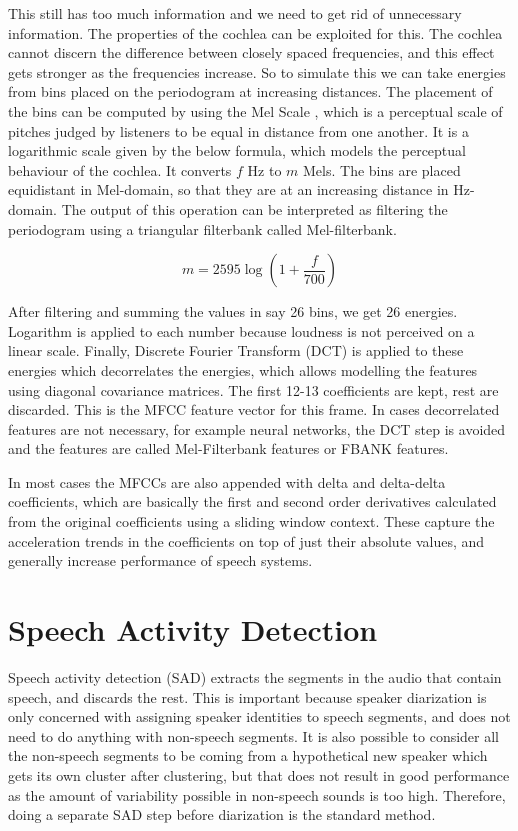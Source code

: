 This still has too much information and we need to get rid of unnecessary information. The properties of the cochlea can be exploited for this. The cochlea cannot discern the difference between closely spaced frequencies, and this effect gets stronger as the frequencies increase. So to simulate this we can take energies from bins placed on the periodogram at increasing distances. The placement of the bins can be computed by using the Mel Scale \cite{logan2000mel}, which is a perceptual scale of pitches judged by listeners to be equal in distance from one another. It is a logarithmic scale given by the below formula, which models the perceptual behaviour of the cochlea. It converts $f$ Hz to $m$ Mels. The bins are placed equidistant in Mel-domain, so that they are at an increasing distance in Hz-domain. The output of this operation can be interpreted as filtering the periodogram using a triangular filterbank called Mel-filterbank.

$$ m = 2595 \log \left( 1+\frac{f}{700} \right) $$

After filtering and summing the values in say 26 bins, we get 26 energies. Logarithm is applied to each number because loudness is not perceived on a linear scale. Finally, Discrete Fourier Transform (DCT) is applied to these energies which decorrelates the energies, which allows modelling the features using diagonal covariance matrices. The first 12-13 coefficients are kept, rest are discarded. This is the MFCC feature vector for this frame. In cases decorrelated features are not necessary, for example neural networks, the DCT step is avoided and the features are called Mel-Filterbank features or FBANK features.

In most cases the MFCCs are also appended with delta and delta-delta coefficients, which are basically the first and second order derivatives calculated from the original coefficients using a sliding window context. These capture the acceleration trends in the coefficients on top of just their absolute values, and generally increase performance of speech systems.

\section{Speech Activity Detection}
Speech activity detection (SAD) extracts the segments in the audio that contain speech, and discards the rest. This is important because speaker diarization is only concerned with assigning speaker identities to speech segments, and does not need to do anything with non-speech segments. It is also possible to consider all the non-speech segments to be coming from a hypothetical new speaker which gets its own cluster after clustering, but that does not result in good performance as the amount of variability possible in non-speech sounds is too high. Therefore, doing a separate SAD step before diarization is the standard method.


